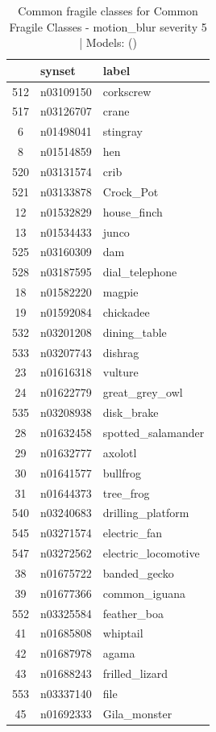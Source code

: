 \begin{table}
\caption{Common fragile classes for Common Fragile Classes - motion_blur severity 5 | Models: ()}
\label{tab:Common Fragile Classes - motion_blur severity 5_d41d8cd9}
\begin{tabular}{cll}
\toprule
 & synset & label \\
\midrule
512 & n03109150 & corkscrew \\
517 & n03126707 & crane \\
6 & n01498041 & stingray \\
8 & n01514859 & hen \\
520 & n03131574 & crib \\
521 & n03133878 & Crock_Pot \\
12 & n01532829 & house_finch \\
13 & n01534433 & junco \\
525 & n03160309 & dam \\
528 & n03187595 & dial_telephone \\
18 & n01582220 & magpie \\
19 & n01592084 & chickadee \\
532 & n03201208 & dining_table \\
533 & n03207743 & dishrag \\
23 & n01616318 & vulture \\
24 & n01622779 & great_grey_owl \\
535 & n03208938 & disk_brake \\
28 & n01632458 & spotted_salamander \\
29 & n01632777 & axolotl \\
30 & n01641577 & bullfrog \\
31 & n01644373 & tree_frog \\
540 & n03240683 & drilling_platform \\
545 & n03271574 & electric_fan \\
547 & n03272562 & electric_locomotive \\
38 & n01675722 & banded_gecko \\
39 & n01677366 & common_iguana \\
552 & n03325584 & feather_boa \\
41 & n01685808 & whiptail \\
42 & n01687978 & agama \\
43 & n01688243 & frilled_lizard \\
553 & n03337140 & file \\
45 & n01692333 & Gila_monster \\

\end{tabular}
\end{table}

